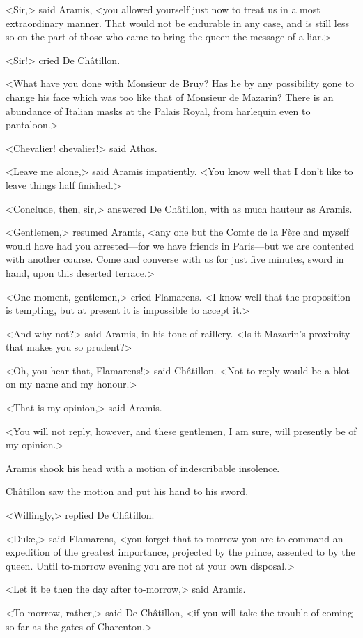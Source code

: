 <Sir,> said Aramis, <you allowed yourself just now to treat us in a most extraordinary manner. That would not be endurable in any case, and is still less so on the part of those who came to bring the queen the message of a liar.>

<Sir!> cried De Châtillon.

<What have you done with Monsieur de Bruy? Has he by any possibility gone to change his face which was too like that of Monsieur de Mazarin? There is an abundance of Italian masks at the Palais Royal, from harlequin even to pantaloon.>

<Chevalier! chevalier!> said Athos.

<Leave me alone,> said Aramis impatiently. <You know well that I don't like to leave things half finished.>

<Conclude, then, sir,> answered De Châtillon, with as much hauteur as Aramis.

<Gentlemen,> resumed Aramis, <any one but the Comte de la Fère and myself would have had you arrested—for we have friends in Paris—but we are contented with another course. Come and converse with us for just five minutes, sword in hand, upon this deserted terrace.>

<One moment, gentlemen,> cried Flamarens. <I know well that the proposition is tempting, but at present it is impossible to accept it.>

<And why not?> said Aramis, in his tone of raillery. <Is it Mazarin's proximity that makes you so prudent?>

<Oh, you hear that, Flamarens!> said Châtillon. <Not to reply would be a blot on my name and my honour.>

<That is my opinion,> said Aramis.

<You will not reply, however, and these gentlemen, I am sure, will presently be of my opinion.>

Aramis shook his head with a motion of indescribable insolence.

Châtillon saw the motion and put his hand to his sword.

<Willingly,> replied De Châtillon.

<Duke,> said Flamarens, <you forget that to-morrow you are to command an expedition of the greatest importance, projected by the prince, assented to by the queen. Until to-morrow evening you are not at your own disposal.>

<Let it be then the day after to-morrow,> said Aramis.

<To-morrow, rather,> said De Châtillon, <if you will take the trouble of coming so far as the gates of Charenton.>

